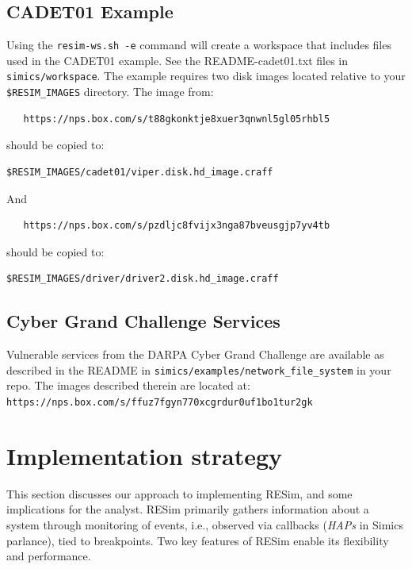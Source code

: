 \documentclass[titlepage]{article}
\begin{document}
\subsection{CADET01 Example}
Using the {\tt resim-ws.sh -e} command will create a workspace that includes files used in the CADET01 example.
See the README-cadet01.txt files in {\tt simics/workspace}.
The example requires two disk images located relative to your {\tt \$RESIM\_IMAGES} directory.  The image from: 
\begin{verbatim}
   https://nps.box.com/s/t88gkonktje8xuer3qnwnl5gl05rhbl5
\end{verbatim}
\noindent should be copied to:
\begin{verbatim}
$RESIM_IMAGES/cadet01/viper.disk.hd_image.craff
\end{verbatim}
And
\begin{verbatim}
   https://nps.box.com/s/pzdljc8fvijx3nga87bveusgjp7yv4tb
\end{verbatim}
\noindent should be copied to:
\begin{verbatim}
$RESIM_IMAGES/driver/driver2.disk.hd_image.craff
\end{verbatim}



\subsection{Cyber Grand Challenge Services}
Vulnerable services from the DARPA Cyber Grand Challenge are available as described in the
README in {\tt simics/examples/network\_file\_system} in your repo.
The images described therein are located at: 
\newline
{\tt https://nps.box.com/s/ffuz7fgyn770xcgrdur0uf1bo1tur2gk}

\section{Implementation strategy}
\label{implementation}
This section discusses our approach to implementing RESim, and some implications for the analyst.
RESim primarily gathers information about a system through monitoring of events, i.e., observed via callbacks (\textit{HAPs} in Simics parlance), tied to 
breakpoints.  Two key features of RESim enable its flexibility and performance.  
\end{document}
